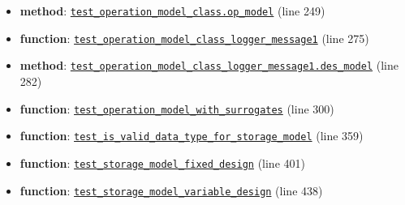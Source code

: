 \documentclass[11pt]{report}
\begin{document}
\begin{itemize}[leftmargin=*]
  \item \textbf{method}: \hyperref[def:pricetaker-tests-test_design_and_operation_models.py:test_operation_model_class.op_model:L249]{\texttt{test\_operation\_model\_class.op\_model}} (line 249)
  \item \textbf{function}: \hyperref[def:pricetaker-tests-test_design_and_operation_models.py:test_operation_model_class_logger_message1:L275]{\texttt{test\_operation\_model\_class\_logger\_message1}} (line 275)
  \item \textbf{method}: \hyperref[def:pricetaker-tests-test_design_and_operation_models.py:test_operation_model_class_logger_message1.des_model:L282]{\texttt{test\_operation\_model\_class\_logger\_message1.des\_model}} (line 282)
  \item \textbf{function}: \hyperref[def:pricetaker-tests-test_design_and_operation_models.py:test_operation_model_with_surrogates:L300]{\texttt{test\_operation\_model\_with\_surrogates}} (line 300)
  \item \textbf{function}: \hyperref[def:pricetaker-tests-test_design_and_operation_models.py:test_is_valid_data_type_for_storage_model:L359]{\texttt{test\_is\_valid\_data\_type\_for\_storage\_model}} (line 359)
  \item \textbf{function}: \hyperref[def:pricetaker-tests-test_design_and_operation_models.py:test_storage_model_fixed_design:L401]{\texttt{test\_storage\_model\_fixed\_design}} (line 401)
  \item \textbf{function}: \hyperref[def:pricetaker-tests-test_design_and_operation_models.py:test_storage_model_variable_design:L438]{\texttt{test\_storage\_model\_variable\_design}} (line 438)
\end{itemize}
\end{document}
